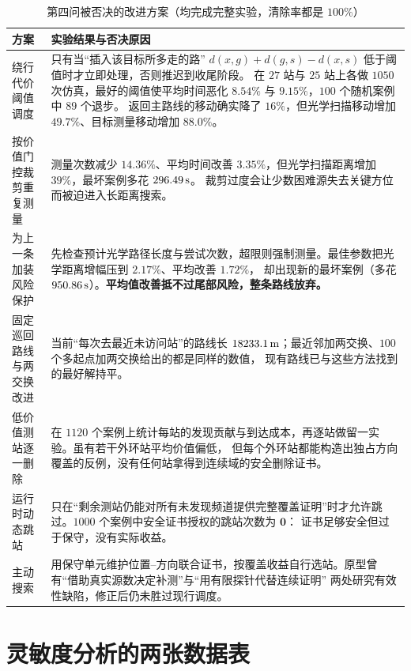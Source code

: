 \begin{appendices}
\begin{table}[!htbp]
  \caption{第四问被否决的改进方案（均完成完整实验，清除率都是 $100\%$）}\label{tab:q4reject}\centering\small
  \begin{tabularx}{\textwidth}{>{\raggedright\arraybackslash}p{3.6cm} L}
    \toprule[1.5pt]
    方案 & 实验结果与否决原因 \\
    \midrule[1pt]
    绕行代价阈值调度 &
      只有当“插入该目标所多走的路” $d(x,g)+d(g,s)-d(x,s)$ 低于阈值时才立即处理，否则推迟到收尾阶段。
      在 $27$ 站与 $25$ 站上各做 $1050$ 次仿真，最好的阈值使平均时间恶化 $8.54\%$ 与 $9.15\%$，$100$ 个随机案例中 $89$ 个退步。
      返回主路线的移动确实降了 $16\%$，但光学扫描移动增加 $49.7\%$、目标测量移动增加 $88.0\%$。 \\
    按价值门控裁剪重复测量 &
      测量次数减少 $14.36\%$、平均时间改善 $3.35\%$，但光学扫描距离增加 $39\%$，最坏案例多花 $296.49\,\mathrm{s}$。
      裁剪过度会让少数困难源失去关键方位而被迫进入长距离搜索。 \\
    为上一条加装风险保护 &
      先检查预计光学路径长度与尝试次数，超限则强制测量。最佳参数把光学距离增幅压到 $2.17\%$、平均改善 $1.72\%$，
      却出现新的最坏案例（多花 $950.86\,\mathrm{s}$）。\textbf{平均值改善抵不过尾部风险，整条路线放弃。} \\
    固定巡回路线与两交换改进 &
      当前“每次去最近未访问站”的路线长 $18233.1\,\mathrm{m}$；最近邻加两交换、$100$ 个多起点加两交换给出的都是同样的数值，
      现有路线已与这些方法找到的最好解持平。 \\
    低价值测站逐一删除 &
      在 $1120$ 个案例上统计每站的发现贡献与到达成本，再逐站做留一实验。虽有若干外环站平均价值偏低，
      但每个外环站都能构造出独占方向覆盖的反例，没有任何站拿得到连续域的安全删除证书。 \\
    运行时动态跳站 &
      只在“剩余测站仍能对所有未发现频道提供完整覆盖证明”时才允许跳过。$1000$ 个案例中安全证书授权的跳站次数为 $\bm 0$：
      证书足够安全但过于保守，没有实际收益。 \\
    主动搜索 &
      用保守单元维护位置--方向联合证书，按覆盖收益自行选站。原型曾有“借助真实源数决定补测”与“用有限探针代替连续证明”
      两处研究有效性缺陷，修正后仍未胜过现行调度。 \\
    \bottomrule[1.5pt]
  \end{tabularx}
\end{table}

\section{灵敏度分析的两张数据表}\label{app:sens}


\end{appendices}
